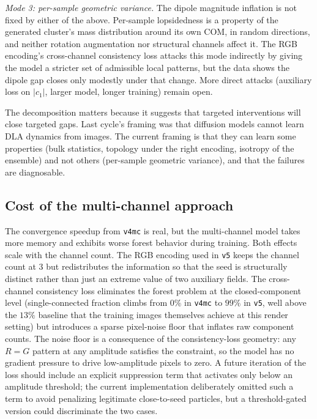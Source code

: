 \documentclass[11pt]{article}
\begin{document}
\textit{Mode 3: per-sample geometric variance.} The dipole magnitude inflation is not fixed by either of the above. Per-sample lopsidedness is a property of the generated cluster's mass distribution around its own COM, in random directions, and neither rotation augmentation nor structural channels affect it. The RGB encoding's cross-channel consistency loss attacks this mode indirectly by giving the model a stricter set of admissible local patterns, but the data shows the dipole gap closes only modestly under that change. More direct attacks (auxiliary loss on $|c_1|$, larger model, longer training) remain open.

The decomposition matters because it suggests that targeted interventions will close targeted gaps. Last cycle's framing was that diffusion models cannot learn DLA dynamics from images. The current framing is that they can learn some properties (bulk statistics, topology under the right encoding, isotropy of the ensemble) and not others (per-sample geometric variance), and that the failures are diagnosable.

\subsection{Cost of the multi-channel approach}

The convergence speedup from \texttt{v4mc} is real, but the multi-channel model takes more memory and exhibits worse forest behavior during training. Both effects scale with the channel count. The RGB encoding used in \texttt{v5} keeps the channel count at $3$ but redistributes the information so that the seed is structurally distinct rather than just an extreme value of two auxiliary fields. The cross-channel consistency loss eliminates the forest problem at the closed-component level (single-connected fraction climbs from $0\%$ in \texttt{v4mc} to $99\%$ in \texttt{v5}, well above the $13\%$ baseline that the training images themselves achieve at this render setting) but introduces a sparse pixel-noise floor that inflates raw component counts. The noise floor is a consequence of the consistency-loss geometry: any $R = G$ pattern at any amplitude satisfies the constraint, so the model has no gradient pressure to drive low-amplitude pixels to zero. A future iteration of the loss should include an explicit suppression term that activates only below an amplitude threshold; the current implementation deliberately omitted such a term to avoid penalizing legitimate close-to-seed particles, but a threshold-gated version could discriminate the two cases.
\end{document}
